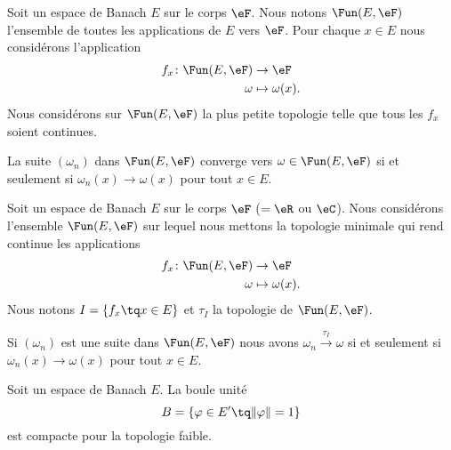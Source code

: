 \begin{lemma}       \label{LEMooMCYAooGMzbbs}
	Soit un espace de Banach \( E\) sur le corps \( \eF\). Nous notons \( \Fun(E,\eF)\) l'ensemble de toutes les applications de \( E\) vers \( \eF\). Pour chaque \( x\in E\) nous considérons l'application
	\begin{equation}
		\begin{aligned}
			f_x\colon \Fun(E,\eF) & \to \eF            \\
			\omega                & \mapsto \omega(x).
		\end{aligned}
	\end{equation}
	Nous considérons sur \( \Fun(E,\eF)\) la plus petite topologie telle que tous les \( f_x\) soient continues.

	La suite \( (\omega_n)\) dans \( \Fun(E,\eF)\) converge vers  \(\omega\in \Fun(E,\eF)\) si et seulement si \( \omega_n(x)\to\omega(x)\) pour tout \( x\in E\).
\end{lemma}


\begin{lemma}       \label{LEMooWXBVooSjafZr}
	Soit un espace de Banach \( E\) sur le corps \( \eF\) (\( =\eR\) ou \( \eC\)). Nous considérons l'ensemble \( \Fun(E,\eF) \) sur lequel nous mettons la topologie minimale qui rend continue les applications
	\begin{equation}
		\begin{aligned}
			f_x\colon \Fun(E,\eF) & \to \eF            \\
			\omega                & \mapsto \omega(x).
		\end{aligned}
	\end{equation}
	Nous notons \( I=\{ f_x\tq x\in E \} \) et \( \tau_I\) la topologie de \( \Fun(E,\eF)\).

	Si \( (\omega_n)\) est une suite dans \( \Fun(E,\eF)\) nous avons \( \omega_n\stackrel{\tau_I}{\longrightarrow}\omega\) si et seulement si \( \omega_n(x)\to \omega(x)\) pour tout \( x\in E\).
\end{lemma}

\begin{theorem}       \label{THOooRECTooEVLHSq}
	Soit un espace de Banach \( E\). La boule unité
	\begin{equation}
		B=\{ \varphi\in E'\tq \| \varphi \|=1 \}
	\end{equation}
	est compacte pour la topologie faible.
\end{theorem}

